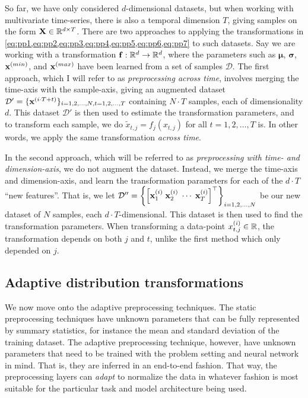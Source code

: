 \documentclass{statsmsc}
\begin{document}
{So far, we have only considered $d$-dimensional datasets, but when working with multivariate
time-series, there is also a temporal dimension $T$, giving samples on the form
$\mathbf{X} \in \mathbb{R}^{d\times T}$. There are two approaches to applying the
transformations in \cref{eq:pp1,eq:pp2,eq:pp3,eq:pp4,eq:pp5,eq:pp6,eq:pp7}
to such datasets. Say we are working with a transformation $\mathbf{f}: \mathbb{R}^d \rightarrow {\mathbb{R}^d}$, where the
parameters such as $\bm\mu$, $\bm\sigma$, $\mathbf{x}^{(min)}$, and $\mathbf{x}^{(max)}$ have been learned
from a set of samples $\mathcal{D}$. The first approach, which I will refer to as
\textit{preprocessing across time}, involves merging the time-axis with the sample-axis, giving
an augmented dataset $\mathcal{D}'=\{\mathbf{x}^{(i\cdot T +t)}\}_{i=1,2,\dots,N,t=1,2,\dots,T}$
containing $N \cdot T$ samples, each of dimensionality $d$. This dataset $\mathcal{D}'$ is then
used to estimate the transformation parameters, and to transform each sample, we do
$\tilde{x}_{t,j}=f_j(x_{t,j})$ for all $t=1,2,\dots,T$ is. In other words, we apply the same
transformation \textit{across time}.

In the second approach, which will be referred to as
\textit{preprocessing with time- and dimension-axis}, we do not augment the dataset. Instead,
we merge the time-axis and dimension-axis, and learn the transformation parameters for
each of the $d \cdot T$ ``new features''. That is, we let
$\mathcal{D}''=\left\{\left[\mathbf{x}^{(i)}_{1} \; \mathbf{x}^{(i)}_{2} \; \cdots \; \mathbf{x}^{(i)}_{T} \right]^\top \right\}_{i=1,2,\dots,N}$ be our new dataset of $N$ samples, each $d\cdot T$-dimensional.
This dataset is then used to find the transformation parameters.
When transforming a data-point $x^{(i)}_{t,j}\in\mathbb{R}$, the transformation depends on both $j$ and $t$,
unlike the first method which only depended on $j$.


\subsection{Adaptive distribution transformations}%
\label{sub:Adaptive distribution transformations}

We now move onto the adaptive preprocessing techniques. The static
preprocessing techniques have unknown parameters that can be fully represented
by summary statistics, for instance the mean and standard deviation of the
training dataset. The adaptive preprocessing technique, however, have unknown
parameters that need to be trained with the problem setting and neural network in
mind.  That is, they are inferred in an end-to-end fashion. That way, the
preprocessing layers can \textit{adapt} to normalize the data in whatever
fashion is most suitable for the particular task and model architecture being used.

}
\end{document}
